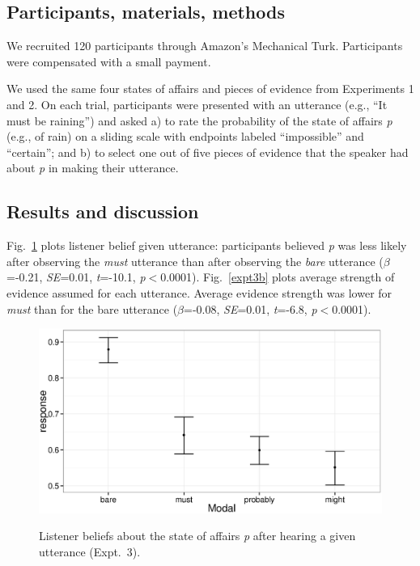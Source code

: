 \documentclass[10pt,letterpaper]{article}
\begin{document}
\subsection{Participants, materials, methods}

We recruited 120 participants through Amazon's Mechanical Turk. Participants were compensated with a small payment.

We used the same four states of affairs and pieces of evidence from Experiments 1 and 2. On each trial, participants were presented with an utterance (e.g., ``It must be raining'') and asked a) to rate the probability of the state of affairs \emph{p} (e.g., of rain) on a sliding scale with endpoints labeled ``impossible'' and ``certain''; and b) to select one out of five pieces of evidence that the speaker had about \emph{p} in making their utterance.

\subsection{Results and discussion}

Fig.~\ref{expt3a} plots listener belief given utterance: participants believed \emph{p} was less likely after observing the \emph{must} utterance than after observing the \emph{bare} utterance ($\beta$=-0.21, \emph{SE}=0.01, \emph{t}=-10.1, \emph{p}$<$0.0001). Fig.~\ref{expt3b} plots average strength of evidence assumed for each utterance. Average evidence strength was lower for \emph{must} than for the bare utterance ($\beta$=-0.08, \emph{SE}=0.01, \emph{t}=-6.8, \emph{p}$<$0.0001).

\begin{figure}
	\centering
	{\includegraphics[width=\linewidth]{expt3a.eps}}
	\caption{Listener beliefs about the state of affairs \emph{p} after hearing a given utterance (Expt.~3).}
	\label{expt3a}
\end{figure}
\end{document}
